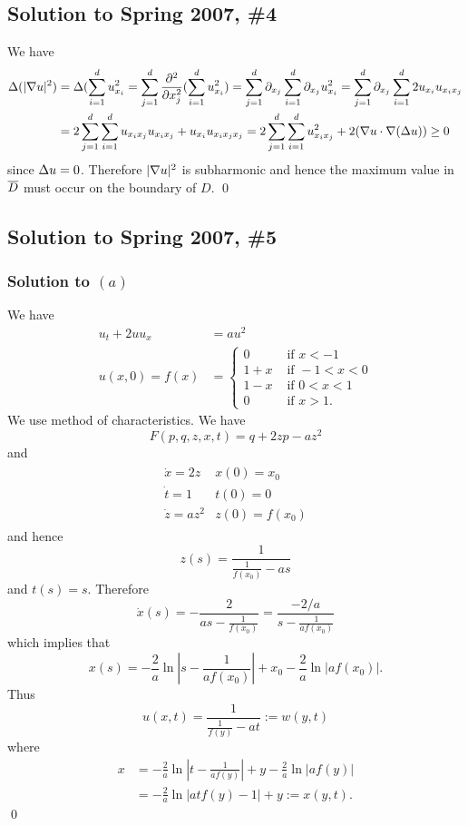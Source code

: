 \subsection*{Solution to Spring 2007, \#4}
We have
\begin{align*}
\Delta(|\nabla u|^{2}) &= \Delta(\sum_{i = 1}^{d}u_{x_{i}}^{2} = \sum_{j = 1}^{d}\frac{\partial^{2}}{\partial x_{j}^{2}}(\sum_{i = 1}^{d}u_{x_{i}}^{2}) = \sum_{j = 1}^{d}\partial_{x_{j}}\sum_{i = 1}^{d}\partial_{x_{j}}u_{x_{i}}^{2} = \sum_{j = 1}^{d}\partial_{x_{j}}\sum_{i = 1}^{d}2u_{x_{i}}u_{x_{i}x_{j}}\\
& = 2 \sum_{j = 1}^{d}\sum_{i = 1}^{d}u_{x_{i}x_{j}}u_{x_{i}x_{j}} + u_{x_{i}}u_{x_{i}x_{j}x_{j}} = 2\sum_{j = 1}^{d}\sum_{i = 1}^{d}u_{x_{i}x_{j}}^{2} + 2(\nabla u \cdot \nabla(\Delta u)) \geq 0
\end{align*}
since $\Delta u = 0$. Therefore $|\nabla u|^{2}$ is subharmonic and hence the maximum value in $\overline{D}$ must occur on the boundary of $D$.
\hfill\qed

\subsection*{Solution to Spring 2007, \#5}
\subsubsection*{Solution to $(a)$}
We have
\begin{align*}
u_{t} + 2uu_{x} &= au^{2}\\
u(x, 0) = f(x) &=
\begin{cases}
0 & \text{ if } x < - 1\\
1 + x & \text{ if } -1 < x < 0\\
1 - x & \text{ if } 0 < x < 1\\
0 & \text{ if } x > 1.
\end{cases}
\end{align*}
We use method of characteristics. We have
$$F(p, q, z, x, t) = q + 2zp - az^{2}$$
and
\begin{align*}
\begin{array}{cc}
\dot{x} = 2z & x(0) = x_{0}\\
\dot{t} = 1 & t(0) = 0\\
\dot{z} = az^{2} & z(0) = f(x_{0})
\end{array}
\end{align*}
and hence
$$z(s) = \frac{1}{\frac{1}{f(x_{0})} - as}$$ and $t(s) = s$. Therefore
$$\dot{x}(s) = -\frac{2}{as - \frac{1}{f(x_{0})}} = \frac{-2/a}{s - \frac{1}{af(x_{0})}}$$
which implies that
$$x(s) = -\frac{2}{a}\ln|s - \frac{1}{af(x_{0})}| + x_{0} - \frac{2}{a}\ln|af(x_{0})|.$$
Thus
$$u(x, t) = \frac{1}{\frac{1}{f(y)} - at} := w(y, t)$$
where
\begin{align*}
x &= -\frac{2}{a}\ln|t - \frac{1}{af(y)}| + y - \frac{2}{a}\ln|af(y)|\\
 &= -\frac{2}{a}\ln|atf(y) - 1| + y := x(y, t).
\end{align*}
\hfill\qed

